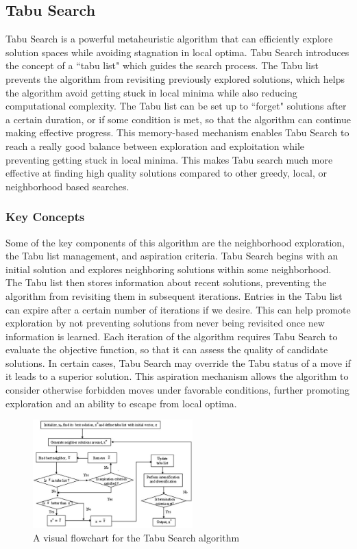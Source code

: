 \documentclass{article}
\begin{document}
\subsection{Tabu Search}
Tabu Search is a powerful metaheuristic algorithm that can efficiently explore solution spaces while avoiding stagnation in local optima. Tabu Search introduces the concept of a ``tabu list" which guides the search process. The Tabu list prevents the algorithm from revisiting previously explored solutions, which helps the algorithm avoid getting stuck in local minima while also reducing computational complexity. The Tabu list can be set up to ``forget" solutions after a certain duration, or if some condition is met, so that the algorithm can continue making effective progress. This memory-based mechanism enables Tabu Search to reach a really good balance between exploration and exploitation while preventing getting stuck in local minima. This makes Tabu search much more effective at finding high quality solutions compared to other greedy, local, or neighborhood based searches.

\subsubsection{Key Concepts}
Some of the key components of this algorithm are the neighborhood exploration, the Tabu list management, and aspiration criteria. Tabu Search begins with an initial solution and explores neighboring solutions within some neighborhood. The Tabu list then stores information about recent solutions, preventing the algorithm from revisiting them in subsequent iterations. Entries in the Tabu list can expire after a certain number of iterations if we desire. This can help promote exploration by not preventing solutions from never being revisited once new information is learned. Each iteration of the algorithm requires Tabu Search to evaluate the objective function, so that it can assess the quality of candidate solutions. In certain cases, Tabu Search may override the Tabu status of a move if it leads to a superior solution. This aspiration mechanism allows the algorithm to consider otherwise forbidden moves under favorable conditions, further promoting exploration and an ability to escape from local optima.
\begin{figure}[h]
    \centering
    \includegraphics[width=0.55\textwidth,keepaspectratio]{tabu.png}
    \caption{A visual flowchart for the Tabu Search algorithm}
    \label{fig:algsOverTime}
\end{figure}
\end{document}
